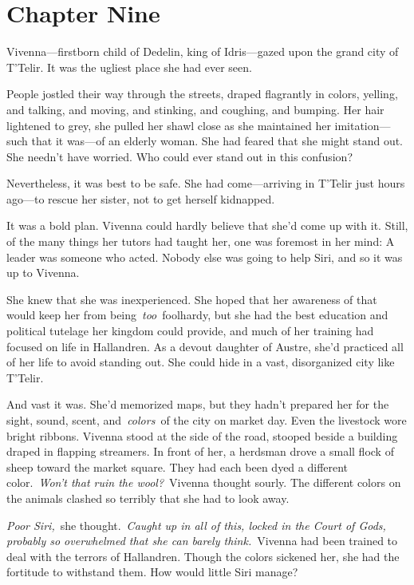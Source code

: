 \section{Chapter Nine}

Vivenna—firstborn child of Dedelin, king of Idris—gazed upon the grand city of T’Telir. It was the ugliest place she had ever seen.

People jostled their way through the streets, draped flagrantly in colors, yelling, and talking, and moving, and stinking, and coughing, and bumping. Her hair lightened to grey, she pulled her shawl close as she maintained her imitation—such that it was—of an elderly woman. She had feared that she might stand out. She needn’t have worried. Who could ever stand out in this confusion?

Nevertheless, it was best to be safe. She had come—arriving in T’Telir just hours ago—to rescue her sister, not to get herself kidnapped.

It was a bold plan. Vivenna could hardly believe that she’d come up with it. Still, of the many things her tutors had taught her, one was foremost in her mind: A leader was someone who acted. Nobody else was going to help Siri, and so it was up to Vivenna.

She knew that she was inexperienced. She hoped that her awareness of that would keep her from being~\textit{too}~foolhardy, but she had the best education and political tutelage her kingdom could provide, and much of her training had focused on life in Hallandren. As a devout daughter of Austre, she’d practiced all of her life to avoid standing out. She could hide in a vast, disorganized city like T’Telir.

And vast it was. She’d memorized maps, but they hadn’t prepared her for the sight, sound, scent, and~\textit{colors}~of the city on market day. Even the livestock wore bright ribbons. Vivenna stood at the side of the road, stooped beside a building draped in flapping streamers. In front of her, a herdsman drove a small flock of sheep toward the market square. They had each been dyed a different color.~\textit{Won’t that ruin the wool?}~Vivenna thought sourly. The different colors on the animals clashed so terribly that she had to look away.

\textit{Poor Siri,}~she thought.~\textit{Caught up in all of this, locked in the Court of Gods, probably so overwhelmed that she can barely think.}~Vivenna had been trained to deal with the terrors of Hallandren. Though the colors sickened her, she had the fortitude to withstand them. How would little Siri manage?

